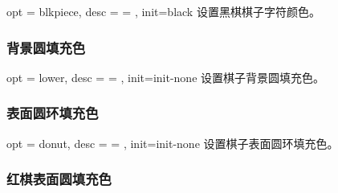 \documentclass[full]{l3doc}
\begin{document}
\begin{documentation}
\begin{option}{ opt = blkpiece, desc = {= }, init=black }
  设置黑棋棋子字符颜色。
\end{option}

\begin{SideBySideExample}[frame=single,numbers=left,
                xrightmargin=.60\linewidth,gobble=2]
  \centering
  \cchessboard[blkpiece=white]
\end{SideBySideExample}

\bigskip

\subsubsection{背景圆填充色}

\begin{option}{ opt = lower, desc = {= }, init=init-none }
  设置棋子背景圆填充色。
\end{option}

\begin{SideBySideExample}[frame=single,numbers=left,
                xrightmargin=.60\linewidth,gobble=2]
  \centering
  \cchessboard[lower=black]
\end{SideBySideExample}

\bigskip

\subsubsection{表面圆环填充色}

\begin{option}{ opt = donut, desc = {= }, init=init-none }
  设置棋子表面圆环填充色。
\end{option}

\begin{SideBySideExample}[frame=single,numbers=left,
                xrightmargin=.60\linewidth,gobble=2]
  \centering
  \cchessboard[donut=red]
\end{SideBySideExample}

\bigskip

\subsubsection{红棋表面圆填充色}


\end{documentation}
\end{document}
